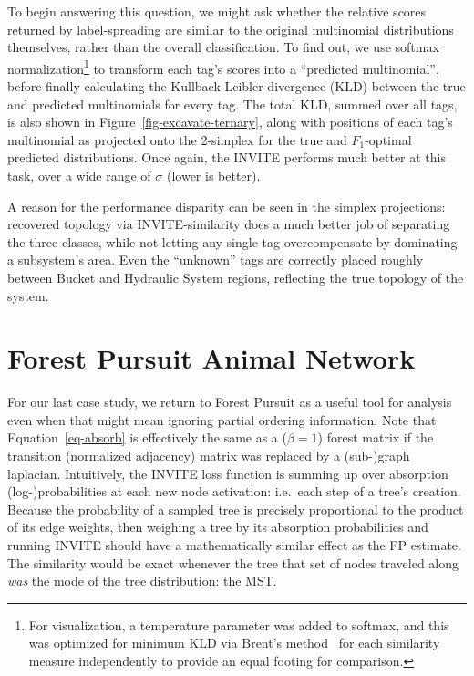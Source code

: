 \documentclass[%
	12pt,
		oneside,
		letterpaper
]{book}
\begin{document}
To begin answering this question, we might ask whether the relative scores returned by label-spreading are similar to the original multinomial distributions themselves, rather than the overall classification.
To find out, we use softmax normalization\footnote{For visualization, a temperature parameter was added to softmax, and this was optimized for minimum KLD via Brent's method~\autocite{algorithmguaranteedconvergence_Brent1971} for each similarity measure independently to provide an equal footing for comparison.}
to transform each tag's scores into a ``predicted multinomial'', before finally calculating the Kullback-Leibler divergence (KLD) between the true and predicted multinomials for every tag.
The total KLD, summed over all tags, is also shown in Figure~\ref{fig-excavate-ternary}, along with positions of each tag's multinomial as projected onto the 2-simplex for the true and \(F_1\)-optimal predicted distributions.
Once again, the INVITE performs much better at this task, over a wide range of \(\sigma\) (lower is better).

A reason for the performance disparity can be seen in the simplex projections: recovered topology via INVITE-similarity does a much better job of separating the three classes, while not letting any single tag overcompensate by dominating a subsystem's area.
Even the ``unknown'' tags are correctly placed roughly between Bucket and Hydraulic System regions, reflecting the true topology of the system.

\section{Forest Pursuit Animal Network}\label{sec-animal-fluency}

For our last case study, we return to Forest Pursuit as a useful tool for analysis even when that might mean ignoring partial ordering information.
Note that Equation~\ref{eq-absorb} is effectively the same as a (\(\beta=1\)) forest matrix if the transition (normalized adjacency) matrix was replaced by a (sub-)graph laplacian.
Intuitively, the INVITE loss function is summing up over absorption (log-)probabilities at each new node activation: i.e.~each step of a tree's creation.
Because the probability of a sampled tree is precisely proportional to the product of its edge weights, then weighing a tree by its absorption probabilities and running INVITE should have a mathematically similar effect as the FP estimate.
The similarity would be exact whenever the tree that set of nodes traveled along \emph{was} the mode of the tree distribution: the MST.
\end{document}

